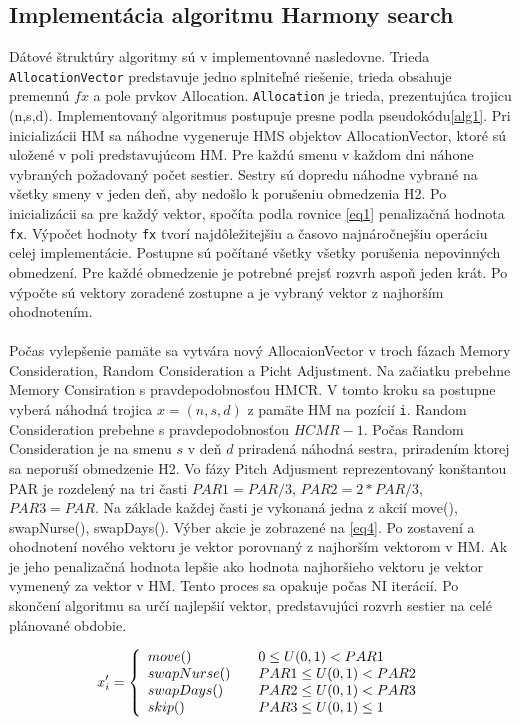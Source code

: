 \documentclass[a4paper, 14pt]{article}
\begin{document}
\subsection{Implementácia algoritmu Harmony search}
Dátové štruktúry algoritmy sú v implementované nasledovne. Trieda \texttt{AllocationVector} predstavuje jedno splniteľné riešenie, trieda obsahuje premennú $fx$ a pole prvkov Allocation. \texttt{Allocation} je trieda, prezentujúca trojicu (n,s,d).
Implementovaný algoritmus postupuje presne podla pseudokódu\ref{alg1}. Pri inicializácii HM sa náhodne vygeneruje HMS objektov AllocationVector, ktoré sú uložené v poli predstavujúcom HM. Pre každú smenu v každom dni náhone vybraných požadovaný počet sestier. Sestry sú dopredu náhodne vybrané na všetky smeny v jeden deň, aby nedošlo k porušeniu obmedzenia H2. Po inicializácii sa pre každý vektor, spočíta podla rovnice \ref{eq1} penalizačná hodnota \texttt{fx}. Výpočet hodnoty \texttt{fx} tvorí najdôležitejšiu a časovo najnáročnejšiu operáciu celej implementácie. Postupne sú počítané všetky všetky porušenia nepovinných obmedzení. Pre každé obmedzenie je potrebné prejsť rozvrh aspoň jeden krát. Po výpočte sú vektory zoradené zostupne a je vybraný vektor z najhorším ohodnotením.\\
\\
Počas vylepšenie pamäte sa vytvára nový AllocaionVector v troch fázach Memory Consideration, Random Consideration a Picht Adjustment. Na začiatku prebehne Memory Consiration s pravdepodobnosťou HMCR. V tomto kroku sa postupne vyberá náhodná trojica $x = (n,s,d)$ z pamäte HM na pozícií \texttt{i}. Random Consideration prebehne s pravdepodobnosťou $HCMR - 1$. Počas Random Consideration je na smenu $s$ v deň $d$ priradená náhodná sestra, priradením ktorej sa neporuší obmedzenie H2. Vo fázy Pitch Adjusment reprezentovaný konštantou PAR je rozdelený na tri časti $PAR1 = PAR/3$, $PAR2 = 2*PAR/3$, $PAR3 = PAR$.  Na základe každej časti je vykonaná jedna z akcií move(), swapNurse(), swapDays(). Výber akcie je zobrazené na \ref{eq4}. Po zostavení a ohodnotení nového vektoru je vektor porovnaný z najhorším vektorom v HM. Ak je jeho penalizačná hodnota lepšie ako hodnota najhoršieho vektoru je vektor vymenený za vektor v HM. Tento proces sa opakuje počas NI iterácií. Po skončení algoritmu sa určí najlepšií vektor, predstavujúci rozvrh sestier na celé plánované obdobie. 
\begin{center}
\begin{eqnarray}
\label{eq4}
x'_i = \left\{ 
\begin{array}{l l}
  move() & \quad \mbox  {$0  \leq U(0,1) < PAR1$}\\
  swapNurse() & \quad \mbox{$PAR1 \leq U(0,1) < PAR2$}\\
  swapDays() & \quad \mbox{$PAR2 \leq U(0,1) < PAR3$}\\
  skip() & \quad \mbox{$PAR3 \leq U(0,1) \leq 1$}\\
\end{array} \right. 
\end{eqnarray}
\end{center}  
\end{document}
